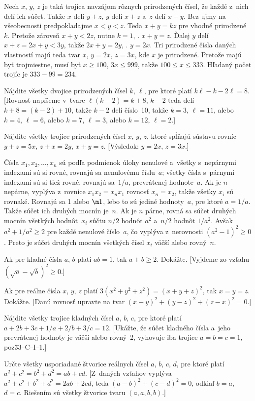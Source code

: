 {%
Nech $x$, $y$, $z$ je taká trojica navzájom rôznych
prirodzených čísel, že každé z~nich delí ich
súčet. Takže $x$ delí $y+z$, $y$ delí $x+z$ 
a~$z$ delí $x+y$. Bez ujmy na všeobecnosti predpokladajme
$x<y<z$. Teda $x+y=kz$ pre vhodné prirodzené~$k$. Pretože
zároveň $x+y<2z$, nutne $k=1$, \tj. $x+y=z$. Ďalej $y$
delí $x+z=2x+y<3y$, takže $2x+y=2y$, \tj. $y=2x$. Tri
prirodzené čísla daných vlastností majú teda tvar $x$, $y=2x$,
$z=3x$, kde $x$ je prirodzené. Pretože majú byť trojmiestne,
musí byť $x\ge100$, $3x\le999$, takže $100\le x \le 333$.
Hľadaný počet trojíc je $333-99=234$.


Nájdite všetky dvojice prirodzených čísel $k$, $\ell$, pre ktoré
platí $k\ell-k-2\ell=8$. [Rovnosť napíšeme v~tvare $\ell(k-2)=k+8$,
$k-2$ teda delí $k+8=(k-2)+10$, takže $k-2$
delí číslo~10, takže $k=3$, $\ell=11$, alebo $k=4$, $\ell=6$,
alebo $k=7$, $\ell=3$, alebo $k=12$, $\ell=2$.]

Nájdite všetky trojice prirodzených čísel $x$, $y$, $z$, ktoré
spĺňajú sústavu rovníc $y+z=5x$, $z+x=2y$, $x+y=z$.
[Výsledok: $y=2x$, $z=3x$.]
}

{%
Čísla $x_1,x_2,\dots,x_n$ sú podľa podmienok úlohy
nenulové a~všetky s~nepárnymi indexami sú si rovné, rovnajú sa
nenulovému číslu~$a$; všetky čísla s~párnymi indexami sú si
tiež rovné, rovnajú sa~$1/a$, prevrátenej hodnote~$a$. Ak je $n$
nepárne, vyplýva z~rovnice $x_1x_2=x_nx_1$ rovnosť $x_n=x_2$,
takže všetky $x_i$ sú rovnaké. Rovnajú sa 1 alebo $\m1$,
lebo to sú jediné hodnoty~$a$, pre ktoré $a=1/a$. Takže
súčet ich druhých mocnín je~$n$. Ak je $n$ párne, rovná sa
súčet druhých mocnín všetkých hodnôt~$x_i$ súčtu $n/2$ hodnôt
$a^2$ a~$n/2$ hodnôt $1/a^2$. Avšak $a^2 + 1/a^2\ge 2$
pre každé nenulové číslo~$a$, čo vyplýva z~nerovnosti
$(a^2-1)^2\ge0$. Preto je súčet druhých mocnín všetkých čísel
$x_i$ väčší alebo rovný~$n$.


Ak pre kladné čísla $a$, $b$ platí $ab=1$, tak $a+b\ge2$.
Dokážte. [Vyjdeme zo vzťahu $(\sqrt a- \sqrt b)^{2}\ge0$.]

Ak pre reálne čísla $x$, $y$, $z$ platí $3(x^2+y^2+z^2) = (x+y+z)^2$,
tak $x=y=z$. Dokážte. [Danú rovnosť upravte na tvar
$(x-y)^2+(y-z)^2+(z-x)^2=0$.]

Nájdite všetky trojice kladných čísel $a$, $b$, $c$, pre ktoré
platí $a + 2b + 3c + 1/a + 2/b + 3/c = 12$. [Ukážte, že súčet
kladného čísla a~jeho prevrátenej hodnoty je väčší alebo rovný~2,
vyhovuje iba trojice $a = b = c = 1$, poz\. 33--C--I--1.]

Určte všetky usporiadané štvorice reálnych čísel $a$, $b$, $c$,
$d$, pre ktoré platí $a^2 + c^2 = b^2 + d^2 = ab + cd$.
[Z~daných vzťahov vyplýva $a^2 + c^2 + b^2 + d^2 = 2ab+2cd$,
teda $(a-b)^2 + (c-d)^2 = 0$, odkiaľ $b=a$, $d=c$.
Riešením sú všetky štvorice tvaru $(a,a,b,b)$.]
}

